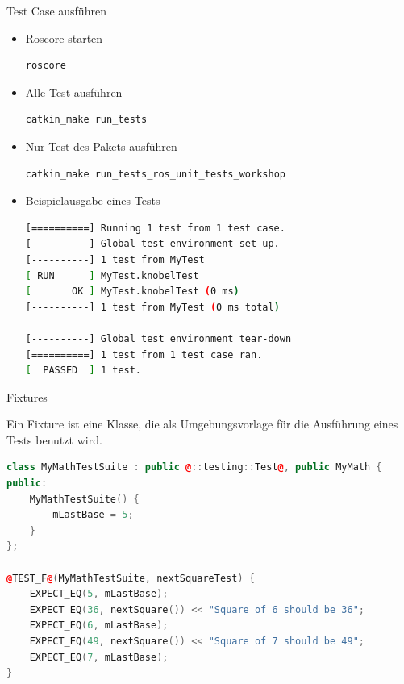 \documentclass{beamer}
\begin{document}
\begin{frame}[fragile]{Test Case ausführen}
\begin{itemize}
\item Roscore starten
\begin{lstlisting}[language=bash, numbers=none]
roscore
\end{lstlisting}
\item Alle Test ausführen
\begin{lstlisting}[language=bash, numbers=none]
catkin_make run_tests
\end{lstlisting}
\item Nur Test des Pakets ausführen
\begin{lstlisting}[language=bash, numbers=none]
catkin_make run_tests_ros_unit_tests_workshop
\end{lstlisting}
\item Beispielausgabe eines Tests
\begin{lstlisting}[language=bash, numbers=none]
[==========] Running 1 test from 1 test case.
[----------] Global test environment set-up.
[----------] 1 test from MyTest
[ RUN      ] MyTest.knobelTest
[       OK ] MyTest.knobelTest (0 ms)
[----------] 1 test from MyTest (0 ms total)

[----------] Global test environment tear-down
[==========] 1 test from 1 test case ran.
[  PASSED  ] 1 test.
\end{lstlisting}
\end{itemize}
\end{frame}


\begin{frame}[fragile]{Fixtures}
\begin{Definition}
Ein Fixture ist eine Klasse, die als Umgebungsvorlage für die Ausführung eines Tests benutzt wird. 
\end{Definition}
\pause
\begin{lstlisting}[language=c++, style=using_colors]
class MyMathTestSuite : public @::testing::Test@, public MyMath {
public:
    MyMathTestSuite() {
    	mLastBase = 5;
    }
};

@TEST_F@(MyMathTestSuite, nextSquareTest) {
	EXPECT_EQ(5, mLastBase);
	EXPECT_EQ(36, nextSquare()) << "Square of 6 should be 36";
	EXPECT_EQ(6, mLastBase);
	EXPECT_EQ(49, nextSquare()) << "Square of 7 should be 49";
	EXPECT_EQ(7, mLastBase);
}
\end{lstlisting}
\end{frame}
\end{document}
